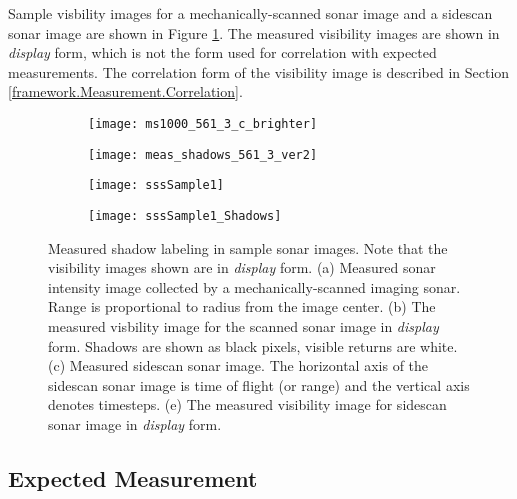 Sample visbility images for a mechanically-scanned sonar image and a sidescan sonar image are shown in Figure \ref{fig:shadowLabelingDisplay}.
The measured visibility images are shown in \emph{display} form, which is not the form used for correlation with expected measurements.
The correlation form of the visibility image is described in Section \ref{framework.Measurement.Correlation}.

\begin{figure}[!h]
  	\centering
	\begin{subfigure}[b]{0.4\textwidth}
                \texttt{[image: ms1000\_561\_3\_c\_brighter]}
                \caption{}
         \end{subfigure}
         \centering
	\begin{subfigure}[b]{0.4\textwidth}
                \texttt{[image: meas\_shadows\_561\_3\_ver2]}
                \caption{}
  	\end{subfigure}
  	
  	\centering
	\begin{subfigure}[b]{0.4\textwidth}
                \texttt{[image: sssSample1]}
                \caption{}
  	\end{subfigure}
  	\centering
	\begin{subfigure}[b]{0.4\textwidth}
                \texttt{[image: sssSample1\_Shadows]}
                \caption{}
  	\end{subfigure}	  	
	\caption{Measured shadow labeling in sample sonar images. Note that the visibility images shown are in \emph{display} form.  (a) Measured sonar intensity image collected by a mechanically-scanned imaging sonar. Range is proportional to radius from the image center. (b) The measured visbility image for the scanned sonar image in \emph{display} form.  Shadows are shown as black pixels, visible returns are white. (c) Measured sidescan sonar image.  The horizontal axis of the sidescan sonar image is time of flight (or range) and the vertical axis denotes timesteps. (e) The measured visibility image for sidescan sonar image in \emph{display} form. }	
	\label{fig:shadowLabelingDisplay}
\end{figure}

\subsection{Expected Measurement}
\label{framework.Measurement.Expected}

